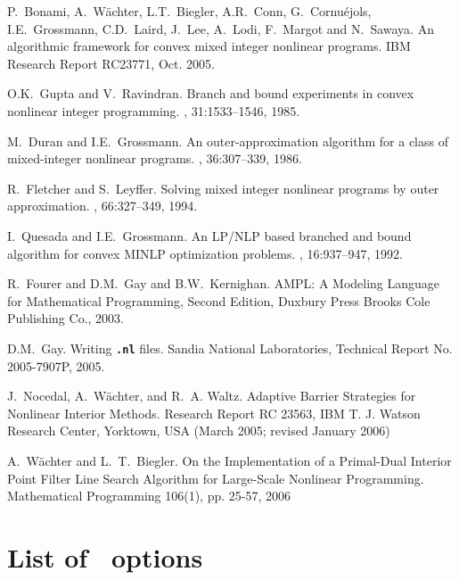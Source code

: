 \documentclass{article}
\begin{document}
\begin{thebibliography}{10}


P.~Bonami, A.~W\"achter, L.T.~Biegler, A.R.~Conn, G.~Cornu\'ejols,
I.E.~Grossmann, C.D.~Laird, J.~Lee, A.~Lodi, F.~Margot and
N.~Sawaya.
\newblock An algorithmic framework for convex mixed integer nonlinear programs. IBM Research Report RC23771, Oct. 2005.

O.K.~Gupta and V.~Ravindran.
\newblock Branch and bound experiments in convex nonlinear integer programming.
, 31:1533--1546, 1985.


M.~Duran and I.E.~Grossmann.
\newblock An outer-approximation algorithm for a class of mixed-integer nonlinear programs.
, 36:307--339, 1986.

R.~Fletcher and S.~Leyffer.
\newblock Solving mixed integer nonlinear programs by outer approximation.
, 66:327--349, 1994.

I.~Quesada and I.E.~Grossmann.
\newblock An {LP/NLP} based branched and bound algorithm for convex {MINLP} optimization problems.
, 16:937--947, 1992.

R.~Fourer and D.M.~Gay and B.W.~Kernighan.
\newblock AMPL: A Modeling Language for Mathematical
Programming, Second Edition,
\newblock Duxbury Press Brooks Cole Publishing Co., 2003.

D.M.~Gay.
\newblock Writing \texttt{\bf .nl} files.
\newblock Sandia National Laboratories, Technical Report No. 2005-7907P, 2005.

J.~Nocedal, A.~W\"achter, and R.~A. Waltz.
\newblock Adaptive Barrier Strategies for Nonlinear Interior Methods.
\newblock Research Report RC 23563, IBM T. J. Watson Research Center, Yorktown, USA (March 2005; revised January 2006)

A.~W\"achter and L.~T.~Biegler.
\newblock On the Implementation of a Primal-Dual Interior Point Filter Line Search Algorithm for Large-Scale Nonlinear Programming.
\newblock Mathematical Programming 106(1), pp. 25-57, 2006
\end{thebibliography}

\appendix
\section{List of \Bonmin\ options}
\label{sec:optList}

\end{document}
